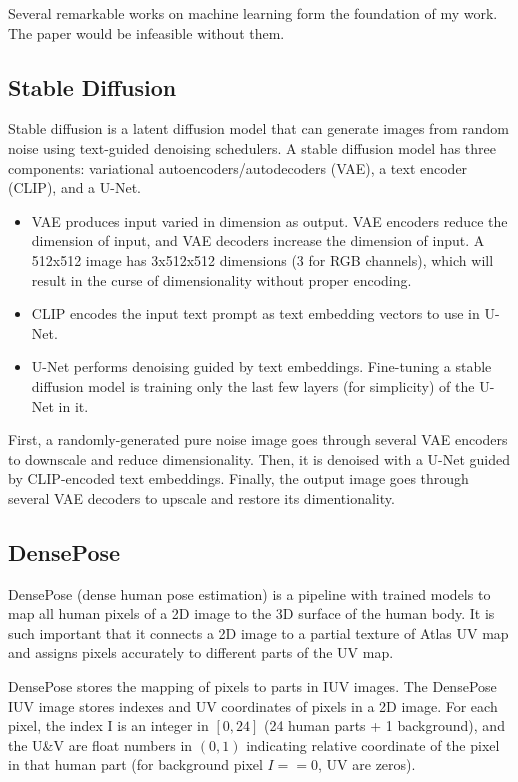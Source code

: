 \documentclass[acmtog]{acmart}
\begin{document}
Several remarkable works on machine learning form the foundation of my work. The paper would be infeasible without them.

\subsection{Stable Diffusion}

Stable diffusion is a latent diffusion model that can generate images from random noise using text-guided denoising schedulers. A stable diffusion model has three components: variational autoencoders/autodecoders (VAE), a text encoder (CLIP), and a U-Net.

\begin{itemize}
  \item VAE produces input varied in dimension as output. VAE encoders reduce the dimension of input, and VAE decoders increase the dimension of input. A 512x512 image has 3x512x512 dimensions (3 for RGB channels), which will result in the curse of dimensionality without proper encoding.
  \item CLIP encodes the input text prompt as text embedding vectors to use in U-Net.
  \item U-Net performs denoising guided by text embeddings. Fine-tuning a stable diffusion model is training only the last few layers (for simplicity) of the U-Net in it.
\end{itemize}

First, a randomly-generated pure noise image goes through several VAE encoders to downscale and reduce dimensionality. Then, it is denoised with a U-Net guided by CLIP-encoded text embeddings. Finally, the output image goes through several VAE decoders to upscale and restore its dimentionality.

\subsection{DensePose}

DensePose (dense human pose estimation) \cite{guler2018densepose} is a pipeline with trained models to map all human pixels of a 2D image to the 3D surface of the human body. It is such important that it connects a 2D image to a partial texture of Atlas UV map and assigns pixels accurately to different parts of the UV map.

DensePose stores the mapping of pixels to parts in IUV images. The DensePose IUV image stores indexes and UV coordinates of pixels in a 2D image. For each pixel, the index I is an integer in \([0,24]\) (24 human parts + 1 background), and the U\&V are float numbers in \((0,1)\) indicating relative coordinate of the pixel in that human part (for background pixel \(I==0\), UV are zeros).
\end{document}
